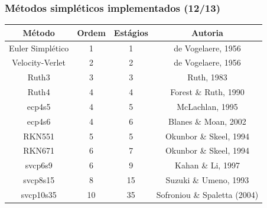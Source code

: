 \begin{frame}
\justifying
\frametitle{Métodos simpléticos implementados (12/13)}

\begin{center}
    \begin{tabular}{|c|c|c|c|}
    \hline
    \textbf{Método} & \textbf{Ordem} & \textbf{Estágios} & \textbf{Autoria}
    \\ \hline
    Euler Simplético & 1 & 1 & de Vogelaere, 1956
    \\ \hline
    Velocity-Verlet & 2 & 2 & de Vogelaere, 1956
    \\ \hline
    Ruth3 & 3 & 3 & Ruth, 1983
    \\ \hline
    Ruth4 & 4 & 4 & Forest \& Ruth, 1990
    \\ \hline
    ecp4s5 & 4 & 5 & McLachlan, 1995
    \\ \hline
    ecp4s6 & 4 & 6 & Blanes \& Moan, 2002
    \\ \hline
    RKN551 & 5 & 5 & Okunbor \& Skeel, 1994
    \\ \hline
    RKN671 & 6 & 7 & Okunbor \& Skeel, 1994
    \\ \hline
    svcp6s9 & 6 & 9 & Kahan \& Li, 1997
    \\ \hline
    svcp8s15 & 8 & 15 & Suzuki \& Umeno, 1993
    \\ \hline
    svcp10s35 & 10 & 35 & Sofroniou \& Spaletta (2004)
    \\ \hline
    \end{tabular}
\end{center}

\end{frame}






